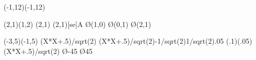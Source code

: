 \documentclass{jarticle}
\begin{document}
\begin{zahyou}[ul=8mm](-1,12)(-1,12)
\zahyouMemori[g]%
\def\E{(2,1)}%
\def\F{(1,2)}%
%
\begin{azahyou}\E\F
  \def\A{(2,1)}
  \azKuromaru\A
  \azPut\A[se]{A}
  \azArrowLine\O{(1,0)}
  \azArrowLine\O{(0,1)}
  \azArrowLine\O\A
\end{azahyou}
\end{zahyou}

\begin{zahyou}[ul=10mm](-3,5)(-1,5)
  \zahyouMemori[g]%
  \def\Fx{(X*X+.5)/sqrt(2)}
  \YKinziOresen\Fx\xmin{}\oresen
  \YKinziOresen\Fx{-1/sqrt(2)}{1/sqrt(2)}{.05}\nurisen
  \edefappend{}
  \YGurafu(.1)(.05)\Fx\xmin\xmax
  \kTyokusen\O{-45}{}{}\Put{}
  \kTyokusen\O{45}{}{}\Put{}
  \begin{azahyou}\E\F
    \azTenretutoz\oresen\oresen
    \azTenretutoz\nurisen\nurisen
    \clipDrawline\oresen
    \Nuritubusi\nurisen
  \end{azahyou}
\end{zahyou}
\end{document}
